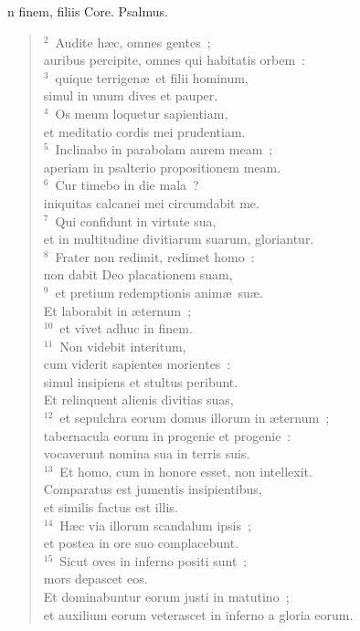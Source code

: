 \bchapter[Psalm]
n finem, filiis Core. Psalmus.
\begin{verse}${}^{2}$~Audite h\ae c, omnes gentes~;\\ auribus percipite, omnes qui habitatis orbem~:\\
${}^{3}$~quique terrigen\ae\ et filii hominum,\\ simul in unum dives et pauper.\\
${}^{4}$~Os meum loquetur sapientiam,\\ et meditatio cordis mei prudentiam.\\
${}^{5}$~Inclinabo in parabolam aurem meam~;\\ aperiam in psalterio propositionem meam.\\
${}^{6}$~Cur timebo in die mala~?\\ iniquitas calcanei mei circumdabit me.\\
${}^{7}$~Qui confidunt in virtute sua,\\ et in multitudine divitiarum suarum, gloriantur.\\
${}^{8}$~Frater non redimit, redimet homo~:\\ non dabit Deo placationem suam,\\
${}^{9}$~et pretium redemptionis anim\ae\ su\ae .\\ Et laborabit in \ae ternum~;\\
${}^{10}$~et vivet adhuc in finem.\\
${}^{11}$~Non videbit interitum,\\ cum viderit sapientes morientes~:\\ simul insipiens et stultus peribunt.\\ Et relinquent alienis divitias suas,\\
${}^{12}$~et sepulchra eorum domus illorum in \ae ternum~;\\ tabernacula eorum in progenie et progenie~:\\ vocaverunt nomina sua in terris suis.\\
${}^{13}$~Et homo, cum in honore esset, non intellexit.\\ Comparatus est jumentis insipientibus,\\ et similis factus est illis.\\
${}^{14}$~H\ae c via illorum scandalum ipsis~;\\ et postea in ore suo complacebunt.\\
${}^{15}$~Sicut oves in inferno positi sunt~:\\ mors depascet eos.\\ Et dominabuntur eorum justi in matutino~;\\ et auxilium eorum veterascet in inferno a gloria eorum.\\

\end{verse}

